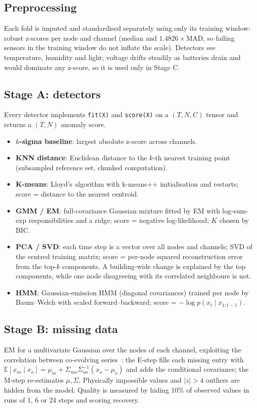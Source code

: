 \documentclass[11pt]{article}
\begin{document}
\subsection{Preprocessing}
Each fold is imputed and standardised separately using only its training window: robust z-scores per node and channel (median and $1.4826\times$MAD, so failing sensors in the training window do not inflate the scale). Detectors see temperature, humidity and light; voltage drifts steadily as batteries drain and would dominate any z-score, so it is used only in Stage C.

\subsection{Stage A: detectors}
Every detector implements \texttt{fit(X)} and \texttt{score(X)} on a $(T, N, C)$ tensor and returns a $(T, N)$ anomaly score.
\begin{itemize}\itemsep1pt
\item \textbf{$k$-sigma baseline}: largest absolute z-score across channels.
\item \textbf{KNN distance}: Euclidean distance to the $k$-th nearest training point (subsampled reference set, chunked computation).
\item \textbf{K-means}: Lloyd's algorithm with k-means++ initialisation and restarts; score = distance to the nearest centroid.
\item \textbf{GMM / EM}: full-covariance Gaussian mixture fitted by EM with log-sum-exp responsibilities and a ridge; score = negative log-likelihood; $K$ chosen by BIC.
\item \textbf{PCA / SVD}: each time step is a vector over all nodes and channels; SVD of the centred training matrix; score = per-node squared reconstruction error from the top-$k$ components. A building-wide change is explained by the top components, while one node disagreeing with its correlated neighbours is not.
\item \textbf{HMM}: Gaussian-emission HMM (diagonal covariances) trained per node by Baum--Welch with scaled forward--backward; score = $-\log p(x_t \mid x_{1:t-1})$.
\end{itemize}

\subsection{Stage B: missing data}
EM for a multivariate Gaussian over the nodes of each channel, exploiting the correlation between co-evolving series~\cite{cai}: the E-step fills each missing entry with $\mathbb{E}[x_m\mid x_o]=\mu_m+\Sigma_{mo}\Sigma_{oo}^{-1}(x_o-\mu_o)$ and adds the conditional covariance; the M-step re-estimates $\mu,\Sigma$. Physically impossible values and $|z|>4$ outliers are hidden from the model. Quality is measured by hiding 10\% of observed values in runs of 1, 6 or 24 steps and scoring recovery.
\end{document}
